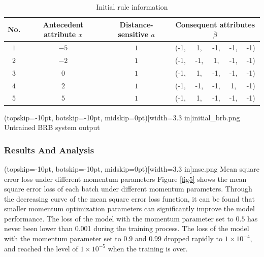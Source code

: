 \documentclass{ieeeaccess}
\begin{document}
\begin{table}
    \caption{Initial rule information}
    \centering
    \normalsize
    \label{tab1}
    \begin{tabular}{cccccccc}
        \hline
        No. & Antecedent attribute $x$ & Distance-sensitive $a$ & \multicolumn{5}{c}{Consequent attributes $\overline{\beta}$}                         \\
        \hline
        $1$ & $-5$                     & $1$                    & (-1,                                                         & 1,  & -1, & -1, & -1) \\
        $2$ & $-2$                     & $1$                    & (-1,                                                         & -1, & 1,  & -1, & -1) \\
        $3$ & $0$                      & $1$                    & (-1,                                                         & 1,  & -1, & -1, & -1) \\
        $4$ & $2$                      & $1$                    & (-1,                                                         & -1, & -1, & 1,  & -1) \\
        $5$ & $5$                      & $1$                    & (-1,                                                         & 1,  & -1, & -1, & -1) \\
        \hline
    \end{tabular}
\end{table}

\Figure[!t](topskip=-10pt, botskip=-10pt, midskip=0pt)[width=3.3 in]{initial_brb.png}
{Untrained BRB system output\label{fig4}}

\subsubsection{Results And Analysis}
\Figure[!t](topskip=-10pt, botskip=-10pt, midskip=0pt)[width=3.3 in]{mse.png}
{Mean square error loss under different momentum parameters\label{fig5}}
Figure \ref{fig5} shows the mean square error loss of each batch under different momentum parameters.
Through the decreasing curve of the mean square error loss function,
it can be found that smaller momentum optimization parameters can significantly improve the model performance.
The loss of the model with the momentum parameter set to $0.5$ has never been lower than 0.001 during the training process.
The loss of the model with the momentum parameter set to $0.9$ and $0.99$ dropped rapidly to $1\times10^{-4}$,
and reached the level of $1\times10^{-5}$ when the training is over.
\end{document}

